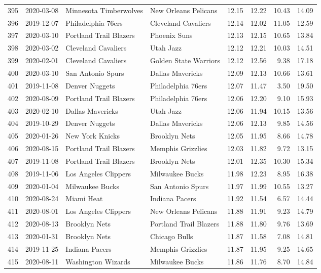 \documentclass[
  11pt,
]{article}
\theoremstyle{nonumberplain}
\begin{document}
\begin{longtable}{rl|llr|rrr}
395 & 2020-03-08 & Minnesota Timberwolves & New Orleans Pelicans & 12.15 & 12.22 & 10.43 & 14.09\\
396 & 2019-12-07 & Philadelphia 76ers & Cleveland Cavaliers & 12.14 & 12.02 & 11.05 & 12.59\\
397 & 2020-03-10 & Portland Trail Blazers & Phoenix Suns & 12.13 & 12.15 & 10.65 & 13.84\\
398 & 2020-03-02 & Cleveland Cavaliers & Utah Jazz & 12.12 & 12.21 & 10.03 & 14.51\\
399 & 2020-02-01 & Cleveland Cavaliers & Golden State Warriors & 12.12 & 12.56 & 9.38 & 17.18\\
400 & 2020-03-10 & San Antonio Spurs & Dallas Mavericks & 12.09 & 12.13 & 10.66 & 13.61\\
401 & 2019-11-08 & Denver Nuggets & Philadelphia 76ers & 12.07 & 11.47 & 3.50 & 19.50\\
402 & 2020-08-09 & Portland Trail Blazers & Philadelphia 76ers & 12.06 & 12.20 & 9.10 & 15.93\\
403 & 2020-02-10 & Dallas Mavericks & Utah Jazz & 12.06 & 11.94 & 10.15 & 13.56\\
404 & 2019-10-29 & Denver Nuggets & Dallas Mavericks & 12.06 & 12.13 & 9.85 & 14.56\\
405 & 2020-01-26 & New York Knicks & Brooklyn Nets & 12.05 & 11.95 & 8.66 & 14.78\\
406 & 2020-08-15 & Portland Trail Blazers & Memphis Grizzlies & 12.03 & 11.82 & 9.72 & 13.15\\
407 & 2019-11-08 & Portland Trail Blazers & Brooklyn Nets & 12.01 & 12.35 & 10.30 & 15.34\\
408 & 2019-11-06 & Los Angeles Clippers & Milwaukee Bucks & 11.98 & 12.23 & 8.95 & 16.38\\
409 & 2020-01-04 & Milwaukee Bucks & San Antonio Spurs & 11.97 & 11.99 & 10.55 & 13.27\\
410 & 2020-08-24 & Miami Heat & Indiana Pacers & 11.92 & 11.54 & 6.57 & 14.44\\
411 & 2020-08-01 & Los Angeles Clippers & New Orleans Pelicans & 11.88 & 11.91 & 9.23 & 14.79\\
412 & 2020-08-13 & Brooklyn Nets & Portland Trail Blazers & 11.88 & 11.80 & 9.76 & 13.69\\
413 & 2020-01-31 & Brooklyn Nets & Chicago Bulls & 11.87 & 11.58 & 7.08 & 14.81\\
414 & 2019-11-25 & Indiana Pacers & Memphis Grizzlies & 11.87 & 11.95 & 9.25 & 14.65\\
415 & 2020-08-11 & Washington Wizards & Milwaukee Bucks & 11.86 & 11.76 & 8.70 & 14.84\\

\end{longtable}
\end{document}
